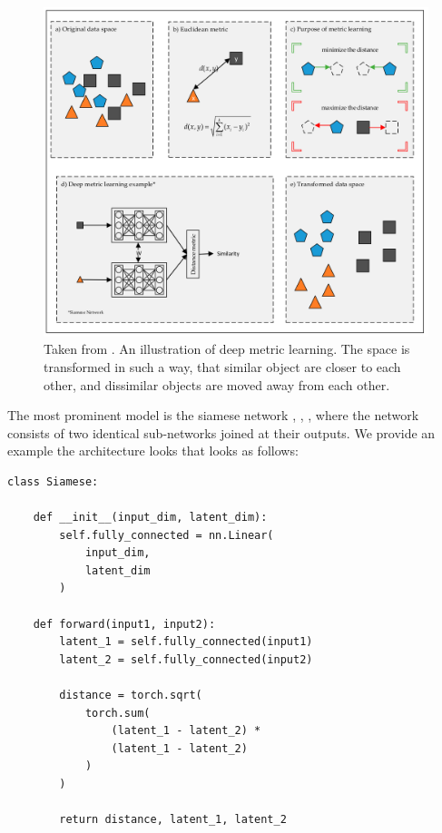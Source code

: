 \documentclass[a4paper,12pt,oneside,openright]{report}
\begin{document}
\begin{figure}[H]
	\center
  \includegraphics[width=\linewidth]{./assets/relatedwork/metric_learning.png}
  \caption{Taken from \cite{kaya19}. An illustration of deep metric learning. The space is transformed in such a way, that similar object are closer to each other, and dissimilar objects are moved away from each other.}
  \label{fig:muse_translation}
\end{figure}

The most prominent model is the siamese network \cite{bromley94}, \cite{chopra05}, \cite{hadsell06}, where the network consists of two identical sub-networks joined at their outputs. 
We provide an example the architecture looks that looks as follows: \\

\begin{tcolorbox}
\begin{verbatim}
class Siamese:

    def __init__(input_dim, latent_dim):
        self.fully_connected = nn.Linear(
            input_dim, 
            latent_dim
        )
        
    def forward(input1, input2):
        latent_1 = self.fully_connected(input1)
        latent_2 = self.fully_connected(input2)
        
        distance = torch.sqrt(
            torch.sum(
                (latent_1 - latent_2) * 
                (latent_1 - latent_2)
            )
        )
        
        return distance, latent_1, latent_2
\end{verbatim}
\end{tcolorbox} 
\end{document}
